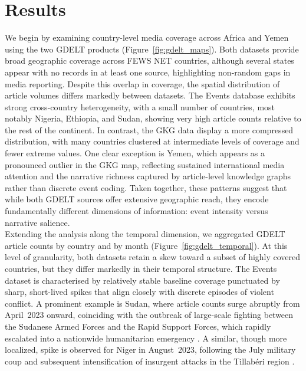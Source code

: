 \documentclass{article}
\begin{document}
\section{Results}
We begin by examining country-level media coverage across Africa and Yemen using the two GDELT products (Figure~\ref{fig:gdelt_maps}). Both datasets provide broad geographic coverage across FEWS NET countries, although several states appear with no records in at least one source, highlighting non-random gaps in media reporting. Despite this overlap in coverage, the spatial distribution of article volumes differs markedly between datasets. The Events database exhibits strong cross-country heterogeneity, with a small number of countries, most notably Nigeria, Ethiopia, and Sudan, showing very high article counts relative to the rest of the continent. In contrast, the GKG data display a more compressed distribution, with many countries clustered at intermediate levels of coverage and fewer extreme values. One clear exception is Yemen, which appears as a pronounced outlier in the GKG map, reflecting sustained international media attention and the narrative richness captured by article-level knowledge graphs rather than discrete event coding. Taken together, these patterns suggest that while both GDELT sources offer extensive geographic reach, they encode fundamentally different dimensions of information: event intensity versus narrative salience.\\

Extending the analysis along the temporal dimension, we aggregated GDELT article counts by country and by month (Figure~\ref{fig:gdelt_temporal}). At this level of granularity, both datasets retain a skew toward a subset of highly covered countries, but they differ markedly in their temporal structure. The Events dataset is characterised by relatively stable baseline coverage punctuated by sharp, short-lived spikes that align closely with discrete episodes of violent conflict. A prominent example is Sudan, where article counts surge abruptly from April~2023 onward, coinciding with the outbreak of large-scale fighting between the Sudanese Armed Forces and the Rapid Support Forces, which rapidly escalated into a nationwide humanitarian emergency \citep{reuters_sudan_2023, unocha_sudan_2023}. A similar, though more localized, spike is observed for Niger in August~2023, following the July military coup and subsequent intensification of insurgent attacks in the Tillabéri region \citep{reuters_niger_2023, icg_niger_2023}.\\
\end{document}
